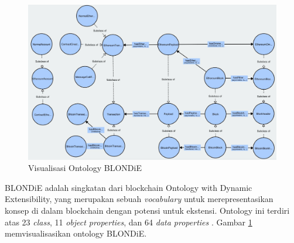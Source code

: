 \begin{figure}[ht]
	\centering
	\includegraphics[width=1\textwidth]{resources/chapter-2/blondie-visualization.jpg}
	\caption{Visualisasi Ontology BLONDiE \parencite{third2017linked}}
	\label{image:blondie-visualization}
\end{figure}

BLONDiE adalah singkatan dari blockchain Ontology with Dynamic Extensibility, yang merupakan sebuah \textit{vocabulary} untuk merepresentasikan konsep di dalam blockchain dengan potensi untuk ekstensi. Ontology ini terdiri atas 23 \textit{class}, 11 \textit{object properties}, dan 64 \textit{data properties} \parencite{hector2020blondie}. Gambar \ref{image:blondie-visualization} memvisualisasikan ontology BLONDiE.